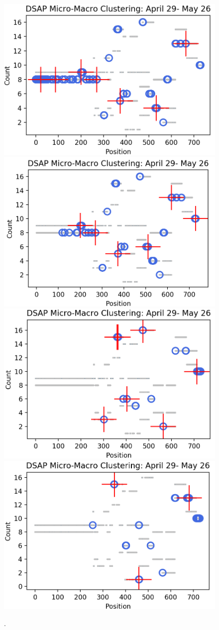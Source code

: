 \begin{figure}
    \centering
        \includegraphics[width = 7.5 cm]{image/Chapters/Chapter6/DSAPalldays.png}\hfill
        \includegraphics[width = 7.5 cm]{image/Chapters/Chapter6/DSAPalldays2000fad.png}\hfill
        \includegraphics[width = 7.5 cm]{image/Chapters/Chapter6/DSAPalldays1000fad.png}\hfill
        \includegraphics[width = 7.5 cm]{image/Chapters/Chapter6/DSAPalldays200fad.png}\hfill
    \caption{.}
    \label{}
\end{figure}













